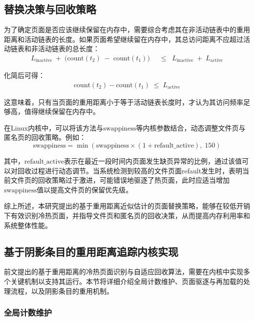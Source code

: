 \subsection{替换决策与回收策略}

为了确定页面是否应该继续保留在内存中，需要综合考虑其在非活动链表中的重用距离和活动链表的长度。如果页面希望继续留在内存中，其总访问距离不应超过活动链表和非活动链表的总长度：
\begin{align}
  \label{eq:active_condition_1}
  L_{\mathrm{inactive}}
  \;+\;
  \bigl(\mathrm{count}(t_2) \;-\; \mathrm{count}(t_1)\bigr)
  &\;\;\le\;\;
  L_{\mathrm{inactive}}
  \;+\;
  L_{\mathrm{active}}
\end{align}

化简后可得：
\begin{align}
  \label{eq:active_condition}
  \mathrm{count}(t_2) - \mathrm{count}(t_1)
  \;\le\;
  L_{\mathrm{active}}
\end{align}

这意味着，只有当页面的重用距离小于等于活动链表长度时，才认为其访问频率足够高，值得继续保留在内存中。

在Linux内核中，可以将该方法与\(\mathrm{swappiness}\)等内核参数结合，动态调整文件页与匿名页的回收策略。例如：
\begin{equation}
  \label{eq:swappiness1}
  \mathrm{swappiness} = \min \left( \mathrm{swappiness} \times (1 + \mathrm{refault\_active}), \; 150 \right)
\end{equation}

其中，\(\mathrm{refault\_active}\)表示在最近一段时间内页面发生缺页异常的比例，通过该值可以对回收过程进行动态调节。当系统检测到较高的文件页面refault发生时，表明当前文件页的回收策略过于激进，可能错误地驱逐了热页面，此时应适当增加\(\mathrm{swappiness}\)值以提高文件页的保留优先级。

综上所述，本研究提出的基于重用距离近似估计的页面替换策略，能够在较低开销下有效识别冷热页面，并指导文件页和匿名页的回收决策，从而提高内存利用率和系统整体性能。

\subsection{基于阴影条目的重用距离追踪内核实现}

前文提出的基于重用距离的冷热页面识别与自适应回收算法，需要在内核中实现多个关键机制以支持其运行。本节将详细介绍全局计数维护、页面驱逐与再加载的处理流程，以及阴影条目的重用机制。

\subsubsection{全局计数维护}

